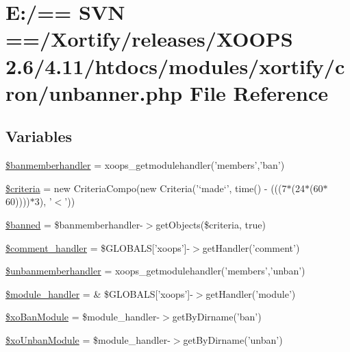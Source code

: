 \hypertarget{cron_2unbanner_8php}{\section{E\-:/== S\-V\-N ==/\-Xortify/releases/\-X\-O\-O\-P\-S 2.6/4.11/htdocs/modules/xortify/cron/unbanner.php File Reference}
\label{cron_2unbanner_8php}
}
\subsection*{Variables}
\begin{DoxyCompactItemize}
\item 
\hyperlink{cron_2unbanner_8php_a787f648c22cbfb8f2a898edb32eee3e6}{\$banmemberhandler} = xoops\-\_\-getmodulehandler('members','ban')
\item 
\hyperlink{cron_2unbanner_8php_a095f2061791cf4be58c4b41a5790dc85}{\$criteria} = new Criteria\-Compo(new Criteria('`made`', time() -\/ (((7$\ast$(24$\ast$(60$\ast$60))))$\ast$3), '$<$'))
\item 
\hyperlink{cron_2unbanner_8php_a910690950e9ee9823bdd1f8f7a7055a9}{\$banned} = \$banmemberhandler-\/$>$get\-Objects(\$criteria, true)
\item 
\hyperlink{cron_2unbanner_8php_a8a2604af20e56f0769bf45487438b167}{\$comment\-\_\-handler} = \$G\-L\-O\-B\-A\-L\-S\mbox{[}'xoops'\mbox{]}-\/$>$get\-Handler('comment')
\item 
\hyperlink{cron_2unbanner_8php_aca5d2f7b731319ff76b78409ddf053d5}{\$unbanmemberhandler} = xoops\-\_\-getmodulehandler('members','unban')
\item 
\hyperlink{cron_2unbanner_8php_afe9169534dbc3935c0823c21cfbf68bb}{\$module\-\_\-handler} = \& \$G\-L\-O\-B\-A\-L\-S\mbox{[}'xoops'\mbox{]}-\/$>$get\-Handler('module')
\item 
\hyperlink{cron_2unbanner_8php_a110f4b3634321d724bce871da3484f52}{\$xo\-Ban\-Module} = \$module\-\_\-handler-\/$>$get\-By\-Dirname('ban')
\item 
\hyperlink{cron_2unbanner_8php_ac6ad0bb9e31c6e133b077f0d7f1aecc1}{\$xo\-Unban\-Module} = \$module\-\_\-handler-\/$>$get\-By\-Dirname('unban')
\end{DoxyCompactItemize}


